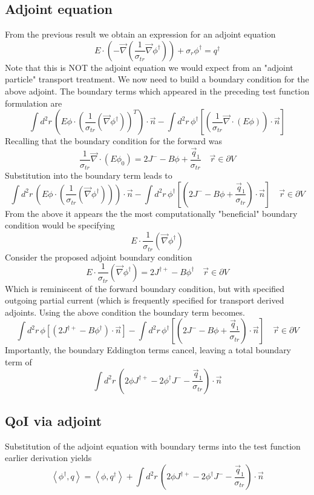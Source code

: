 \documentclass{article}
\newcommand{\vr}{\vec{r}}
\newcommand{\bra}{\left\langle}
\newcommand{\ket}{\right\rangle}
\newcommand{\vdiv}{\vec{\nabla} \cdot}
\newcommand{\vgrad}{\vec{\nabla}}
\begin{document}
\subsection{Adjoint equation}
From the previous result we obtain an expression for an adjoint equation
\[ 
E \cdot \left( - \vgrad \left( \frac{1}{\sigma_{tr}} \vgrad \phi^\dag \right) \right)
+ \sigma_r \phi^\dag
= q^\dag
\]
Note that this is NOT the adjoint equation we would expect from an "adjoint particle" transport treatment. We now need to build a boundary condition for the above adjoint. The boundary terms which appeared in the preceding test function formulation are 
\[
 \int d^2 r \, \left( E \phi \cdot \left( \frac{1}{ \sigma_{tr}} \left(  \vgrad \phi^\dag \right) \right)^T \right) \cdot \vec{n} 
- \int d^2 r \, \phi^\dag \left[ \left( \frac{1}{\sigma_{tr}} \vdiv \left( E \phi \right) \right) \cdot \vec{n} \right]
\]
Recalling that the boundary condition for the forward was
\[
\frac{1}{\sigma_{tr} } \vec{\nabla} \cdot \left(E \phi_0 \right)  = 2J^- - B \phi + \frac{\vec{q}_1}{\sigma_{tr} } \quad \vr \in \partial V
\]
Substitution into the boundary term leads to
\[
 \int d^2 r \, \left( E \phi \cdot \left( \frac{1}{ \sigma_{tr}} \left(  \vgrad \phi^\dag \right) \right) \right) \cdot \vec{n} 
- \int d^2 r \, \phi^\dag \left[ \left( 2J^- - B \phi + \frac{\vec{q}_1}{\sigma_{tr} }  \right) \cdot \vec{n} \right] \quad \vr \in \partial V
\]
From the above it appears the the most computationally "beneficial" boundary condition would be specifying 
\[
E \cdot \frac{1}{ \sigma_{tr}} \left(  \vgrad \phi^\dag \right) 
\]
Consider the proposed adjoint boundary condition
\[
E \cdot \frac{1}{ \sigma_{tr}} \left(  \vgrad \phi^\dag \right) =  2J^{ \dag + } - B \phi^\dag  \quad \vr \in \partial V
\]
Which is reminiscent of the forward boundary condition, but with specified outgoing partial current (which is frequently specified for transport derived adjoints. Using the above condition the boundary term becomes. 
\[
 \int d^2 r \, \phi \left[ \left( 2J^{ \dag + } - B \phi^\dag \right) \cdot \vec{n} \right]
- \int d^2 r \, \phi^\dag \left[ \left( 2J^- - B \phi + \frac{\vec{q}_1}{\sigma_{tr} } \right) \cdot \vec{n} \right]  \quad \vr \in \partial V
\]
Importantly, the boundary Eddington terms cancel, leaving a total boundary term of
\[
 \int d^2 r \, \left( 2\phi J^{ \dag + }  - 2\phi^\dag J^- -  \frac{\vec{q}_1}{\sigma_{tr}} \right) \cdot \vec{n}
\]
\subsection{QoI via adjoint}
Substitution of the adjoint equation with boundary terms into the test function earlier derivation yields
\[
\bra \phi^\dag , q \ket = \bra \phi, q^\dag \ket +  \int d^2 r \, \left( 2\phi J^{ \dag + }  - 2\phi^\dag J^- -  \frac{\vec{q}_1}{\sigma_{tr}} \right) \cdot \vec{n}
\]
\end{document}

